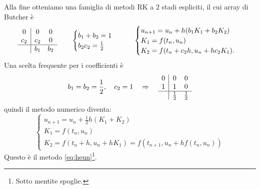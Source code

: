 Alla fine otteniamo una famiglia di metodi RK a $2$ stadi espliciti, il cui array di Butcher è
\begin{equation*}
\begin{array}{ c|c c }
0 & 0 & 0\\
c_{2} & c_{2} & 0\\
\hline
 & b_{1} & b_{2}
\end{array} \qquad \begin{cases}
b_{1} +b_{2} =1\\
b_{2} c_{2} =\frac{1}{2}
\end{cases} \qquad \begin{cases}
u_{n+1} =u_{n} +h( b_{1} K_{1} +b_{2} K_{2})\\
K_{1} =f( t_{n} ,u_{n})\\
K_{2} =f( t_{n} +c_{2} h,u_{n} +hc_{2} K_{1}).
\end{cases}
\end{equation*}
Una scelta frequente per i coefficienti è
\begin{equation*}
b_{1} =b_{2} =\frac{1}{2} ,\quad c_{2} =1\quad \Rightarrow \quad \begin{array}{ c|c c }
0 & 0 & 0\\
1 & 1 & 0\\
\hline
 & \frac{1}{2} & \frac{1}{2}
\end{array}
\end{equation*}
quindi il metodo numerico diventa:
\begin{equation*}
\begin{cases}
u_{n+1} =u_{n} +\frac{1}{2} h( K_{1} +K_{2})\\
K_{1} =f( t_{n} ,u_{n})\\
K_{2} =f( t_{n} +h,u_{n} +hK_{1}) =f( t_{n+1} ,u_{n} +hf( t_{n} ,u_{n}))
\end{cases}
\end{equation*}
Questo è il metodo \eqref{eq:heun}\footnote{Sotto mentite spoglie.}.

